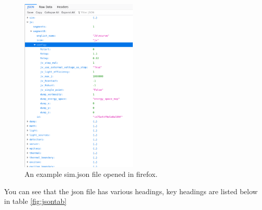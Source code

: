 \begin{figure}[H]
\centering
\includegraphics[width=0.5\textwidth]{./images/json_firefox.png}
\caption{An example sim.json file opened in firefox.}
\label{fig:jsonfirefox}
\end{figure}

You can see that the json file has various headings, key headings are listed below in table \ref{fig:jsontab}

